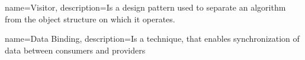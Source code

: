 

\makeglossaries

{
    name=Visitor,
    description={Is a design pattern used to separate an algorithm from the object structure on which it operates.}
}

{
    name=Data Binding,
    description={Is a technique, that enables synchronization of data between consumers and providers}
}





